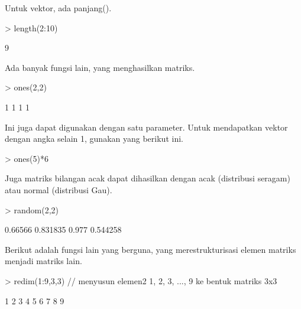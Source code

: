 \documentclass[a4paper,10pt]{article}
\begin{document}
\begin{eulernotebook}
\begin{eulercomment}
\begin{eulercomment}
\begin{eulercomment}
\begin{eulercomment}
\begin{eulercomment}
\begin{eulercomment}
\begin{eulercomment}
Untuk vektor, ada panjang().
\end{eulercomment}
\begin{eulerprompt}
> length(2:10)
\end{eulerprompt}
\begin{euleroutput}
  9
\end{euleroutput}
\begin{eulercomment}
Ada banyak fungsi lain, yang menghasilkan matriks.
\end{eulercomment}
\begin{eulerprompt}
> ones(2,2)
\end{eulerprompt}
\begin{euleroutput}
              1             1 
              1             1 
\end{euleroutput}
\begin{eulercomment}
Ini juga dapat digunakan dengan satu parameter. Untuk mendapatkan
vektor dengan angka selain 1, gunakan yang berikut ini.
\end{eulercomment}
\begin{eulerprompt}
> ones(5)*6
\end{eulerprompt}
\begin{euleroutput}
  [6,  6,  6,  6,  6]
\end{euleroutput}
\begin{eulercomment}
Juga matriks bilangan acak dapat dihasilkan dengan acak (distribusi
seragam) atau normal (distribusi Gau).
\end{eulercomment}
\begin{eulerprompt}
> random(2,2)
\end{eulerprompt}
\begin{euleroutput}
        0.66566      0.831835 
          0.977      0.544258 
\end{euleroutput}
\begin{eulercomment}
Berikut adalah fungsi lain yang berguna, yang merestrukturisasi elemen
matriks menjadi matriks lain.
\end{eulercomment}
\begin{eulerprompt}
> redim(1:9,3,3) // menyusun elemen2 1, 2, 3, ..., 9 ke bentuk matriks 3x3
\end{eulerprompt}
\begin{euleroutput}
              1             2             3 
              4             5             6 
              7             8             9 
\end{euleroutput}
\begin{eulercomment}

\end{eulercomment}
\end{eulercomment}
\end{eulercomment}
\end{eulercomment}
\end{eulercomment}
\end{eulercomment}
\end{eulercomment}
\end{eulernotebook}
\end{document}
